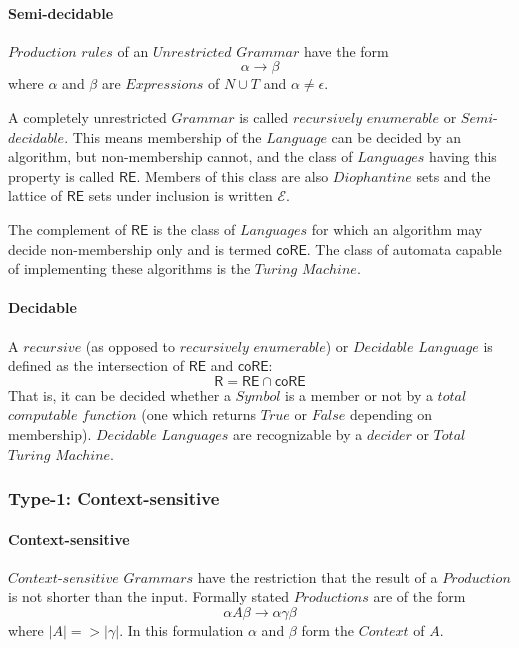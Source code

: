 \documentclass{article}
\begin{document}
    \paragraph{Semi-decidable}
    $Production$ $rules$ of an $Unrestricted$ $Grammar$ have the form
    \[
        \alpha \rightarrow \beta
    \]
    where $\alpha$ and $\beta$ are $Expressions$ of $N \cup T$ and
    $\alpha \neq \epsilon$.

    A completely unrestricted $Grammar$ is called $recursively$
    $enumerable$ or $Semi$-$decidable$. This means membership of the
    $Language$ can be decided by an algorithm, but non-membership
    cannot, and the class of $Languages$ having this property is
    called $\mathsf{RE}$. Members of this class are also $Diophantine$
    sets and the lattice of $\mathsf{RE}$ sets under inclusion is
    written $\mathcal{E}$.

    The complement of $\mathsf{RE}$ is the class of $Languages$ for
    which an algorithm may decide non-membership only and is termed
    $\mathsf{coRE}$. The class of automata capable of implementing
    these algorithms is the $Turing$ $Machine$.

    \paragraph{Decidable}
    A $recursive$ (as opposed to $recursively$ $enumerable$) or
    $Decidable$ $Language$ is defined as the intersection of
    $\mathsf{RE}$ and $\mathsf{coRE}$:
    \[
        \mathsf{R} = \mathsf{RE} \cap \mathsf{coRE}
    \]
    That is, it can be decided whether a $Symbol$ is a member or not
    by a $total$ $computable$ $function$ (one which returns $True$ or
    $False$ depending on membership). $Decidable$ $Languages$ are
    recognizable by a $decider$ or $Total$ $Turing$ $Machine$.

\subsubsection{Type-1: Context-sensitive}

    \paragraph{Context-sensitive}
    $Context$-$sensitive$ $Grammars$ have the restriction that the
    result of a $Production$ is not shorter than the input. Formally
    stated $Productions$ are of the form
    \[
        \alpha A \beta \rightarrow \alpha \gamma \beta
    \]
    where $|A| => |\gamma|$. In this formulation $\alpha$ and $\beta$
    form the $Context$ of $A$.
\end{document}
